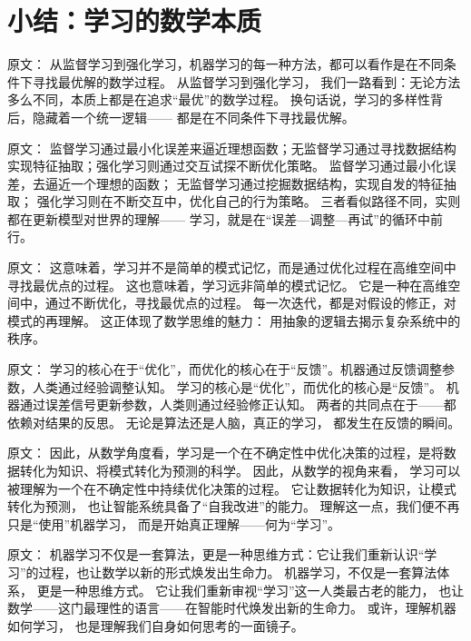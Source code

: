 \section{小结：学习的数学本质}

原文：
从监督学习到强化学习，机器学习的每一种方法，都可以看作是在不同条件下寻找最优解的数学过程。
从监督学习到强化学习，  
我们一路看到：无论方法多么不同，本质上都是在追求“最优”的数学过程。  
换句话说，学习的多样性背后，隐藏着一个统一逻辑——  
都是在不同条件下寻找最优解。



原文：
监督学习通过最小化误差来逼近理想函数；无监督学习通过寻找数据结构实现特征抽取；强化学习则通过交互试探不断优化策略。
监督学习通过最小化误差，去逼近一个理想的函数；  
无监督学习通过挖掘数据结构，实现自发的特征抽取；  
强化学习则在不断交互中，优化自己的行为策略。  
三者看似路径不同，实则都在更新模型对世界的理解——  
学习，就是在“误差—调整—再试”的循环中前行。



原文：
这意味着，学习并不是简单的模式记忆，而是通过优化过程在高维空间中寻找最优点的过程。
这也意味着，学习远非简单的模式记忆。  
它是一种在高维空间中，通过不断优化，寻找最优点的过程。  
每一次迭代，都是对假设的修正，对模式的再理解。  
这正体现了数学思维的魅力：  
用抽象的逻辑去揭示复杂系统中的秩序。



原文：
学习的核心在于“优化”，而优化的核心在于“反馈”。机器通过反馈调整参数，人类通过经验调整认知。
学习的核心是“优化”，而优化的核心是“反馈”。  
机器通过误差信号更新参数，人类则通过经验修正认知。  
两者的共同点在于——都依赖对结果的反思。  
无论是算法还是人脑，真正的学习，  
都发生在反馈的瞬间。



原文：
因此，从数学角度看，学习是一个在不确定性中优化决策的过程，是将数据转化为知识、将模式转化为预测的科学。
因此，从数学的视角来看，  
学习可以被理解为一个在不确定性中持续优化决策的过程。  
它让数据转化为知识，让模式转化为预测，  
也让智能系统具备了“自我改进”的能力。  
理解这一点，我们便不再只是“使用”机器学习，  
而是开始真正理解——何为“学习”。



原文：
机器学习不仅是一套算法，更是一种思维方式：它让我们重新认识“学习”的过程，也让数学以新的形式焕发出生命力。
机器学习，不仅是一套算法体系，  
更是一种思维方式。  
它让我们重新审视“学习”这一人类最古老的能力，  
也让数学——这门最理性的语言——在智能时代焕发出新的生命力。  
或许，理解机器如何学习，  
也是理解我们自身如何思考的一面镜子。


\nocite{*}
\newpage
